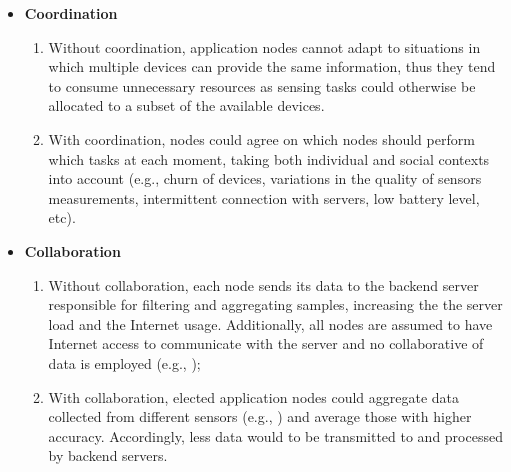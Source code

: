 \begin{itemize}
	
	\item \textbf{Coordination}
	
	\begin{enumerate}[label=-]
		
		\item Without coordination, application nodes cannot adapt to situations in which multiple devices can provide the same information, thus they tend to consume unnecessary resources as sensing tasks could otherwise be allocated to a subset of the available devices.
		
		\item With coordination, nodes could agree on which nodes should perform which tasks at each moment, taking both individual and social contexts into account (e.g., churn of devices, variations in the quality of sensors measurements, intermittent connection with servers, low battery level, etc). 
		
	\end{enumerate}
	
	\item \textbf{Collaboration}
	
	\begin{enumerate}[label=-]
		
		\item Without collaboration, each node sends its data to the backend server responsible for filtering and aggregating samples, increasing the the server load and the Internet usage. Additionally, all nodes are assumed to have Internet access to communicate with the server and no collaborative of data is employed (e.g., \cite{Rajagopalan:2006});
		
		\item With collaboration, elected application nodes could aggregate data collected from different sensors (e.g., \cite{Wang:2015}) and average those with higher accuracy. Accordingly, less data would to be transmitted to and processed by backend servers. 
		
	\end{enumerate}
\end{itemize}

